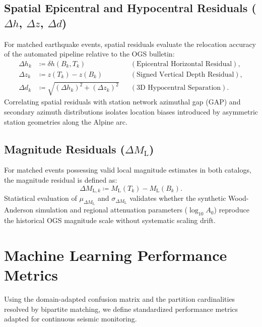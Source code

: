 \subsection{Spatial Epicentral and Hypocentral Residuals
  (\texorpdfstring{$\Delta h$, $\Delta z$, $\Delta d$}{Delta h, Delta
z, Delta d})}
For matched earthquake events, spatial residuals evaluate the
relocation accuracy of the automated pipeline relative to the
\ac{OGS} bulletin:
\begin{align}
  \Delta h_k & \coloneqq \delta h(B_k, T_k) && (\text{Epicentral
  Horizontal Residual}), \\
  \Delta z_k & \coloneqq z(T_k) - z(B_k) && (\text{Signed Vertical Depth
  Residual}), \\
  \Delta d_k & \coloneqq \sqrt{(\Delta h_k)^2 + (\Delta z_k)^2} &&
  (\text{3D Hypocentral Separation}).
\end{align}
Correlating spatial residuals with station network azimuthal gap
($\mathrm{GAP}$) and secondary azimuth distributions isolates
location biases introduced by asymmetric station geometries along
the Alpine arc.

\subsection{Magnitude Residuals (\texorpdfstring{$\Delta
M_{\mathrm{L}}$}{Delta M L})}
For matched events possessing valid local magnitude estimates in
both catalogs, the magnitude residual is defined as:
\begin{equation}
  \Delta M_{\mathrm{L}, k} \coloneqq M_{\mathrm{L}}(T_k) - M_{\mathrm{L}}(B_k).
\end{equation}
Statistical evaluation of $\mu_{\Delta M_{\mathrm{L}}}$ and $\sigma_{\Delta
M_{\mathrm{L}}}$ validates whether the synthetic Wood-Anderson simulation and
regional attenuation parameters ($\log_{10} A_0$) reproduce the
historical \ac{OGS} magnitude scale without systematic scaling drift.

\section{Machine Learning Performance Metrics}
\label{sec:ml_metrics}

Using the domain-adapted confusion matrix and the partition
cardinalities resolved by bipartite matching, we define standardized
performance metrics adapted for continuous seismic monitoring.

